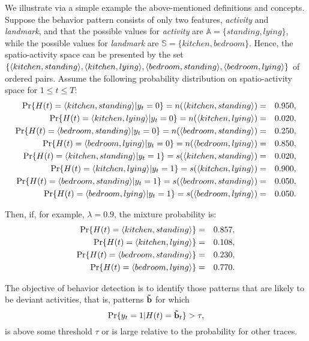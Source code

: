 We illustrate via a simple example the above-mentioned definitions and concepts. Suppose the behavior pattern consists of only two features, \emph{activity} and \emph{landmark}, and that the possible values for \emph{activity} are $\mathbb{A}=\{standing, lying\}$, while the possible values for \emph{landmark} are $\mathbb{S}=\{kitchen, bedroom\}$. Hence, the spatio-activity space can be presented by the set $\{\langle kitchen, standing \rangle, \langle kitchen, lying \rangle, \langle bedroom, standing \rangle, \langle bedroom, lying \rangle\}$ of ordered pairs.
Assume the following probability distribution on spatio-activity space for $1 \leq t \leq T$:
\begin{eqnarray*}
\text{Pr}\{H(t)=\langle kitchen, standing \rangle|y_t=0\} 	= n(\langle kitchen, standing \rangle) &=& 0.950, \\
\text{Pr}\{H(t)=\langle kitchen, lying \rangle|y_t=0\}  	= n(\langle kitchen, lying \rangle) &=& 0.020, \\
\text{Pr}\{H(t)=\langle bedroom, standing \rangle|y_t=0\}  = n(\langle bedroom, standing \rangle) &=& 0.250, \\
\text{Pr}\{H(t)=\langle bedroom, lying \rangle|y_t=0\} 	= n(\langle bedroom, lying \rangle) &=& 0.850,\\
\text{Pr}\{H(t)=\langle kitchen, standing \rangle|y_t=1\}  = s(\langle kitchen, standing \rangle) &=& 0.020, \\
\text{Pr}\{H(t)=\langle kitchen, lying \rangle|y_t=1\}  	= s(\langle kitchen, lying \rangle) &=& 0.900, \\
\text{Pr}\{H(t)=\langle bedroom, standing \rangle|y_t=1\}  = s(\langle bedroom, standing \rangle) &=& 0.050, \\
\text{Pr}\{H(t)=\langle bedroom, lying \rangle|y_t=1\} 	= s(\langle bedroom, lying \rangle) &=& 0.050.
\end{eqnarray*}

Then, if, for example, $\lambda=0.9$, the mixture probability is:
\begin{eqnarray*}
\text{Pr}\{H(t)=\langle kitchen, standing \rangle\} 	&=& 0.857, \\
\text{Pr}\{H(t)=\langle kitchen, lying \rangle\} 		&=& 0.108, \\
\text{Pr}\{H(t)=\langle bedroom, standing \rangle\} 	&=& 0.230, \\
\text{Pr}\{H(t)=\langle bedroom, lying \rangle\} 		&=& 0.770.
\end{eqnarray*}

The objective of behavior detection is to identify those patterns that are likely to be deviant activities, that is, patterns $\mathbf{\tilde{b}}$ for which
\begin{equation}
		\text{Pr}\{y_t=1|H(t)=\mathbf{\tilde{b}}_t\} > \tau,
\label{eq:detect}
\end{equation}
is above some threshold $\tau$ or is large relative to the probability for other traces.

